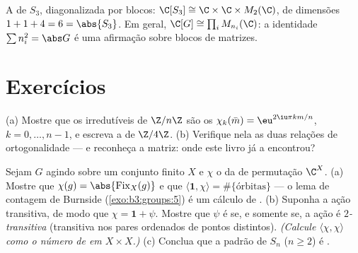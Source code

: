 \begin{omfigure}

{\small A  de $S_3$, diagonalizada por blocos:
$\C[S_3] \cong \C \times \C \times M_2(\C)$, de dimensões $1 + 1 +
4 = 6 = \abs{S_3}$. Em geral, $\C[G] \cong \prod_i
M_{n_i}(\C)$: a identidade $\sum n_i^2 = \abs G$ é uma
afirmação sobre blocos de matrizes.}
\end{omfigure}

\section{Exercícios}

\begin{exercise}[$\star$]\label{exo:b3:representations:1}
(a) Mostre que os  irredutíveis de $\Z/n\Z$ são os $\chi_k(\bar m) = \eu^{2\iu\pi km/n}$,
$k = 0, \dots, n-1$, e escreva a  de $\Z/4\Z$.
(b) Verifique nela as duas relações de ortogonalidade --- e reconheça a
matriz: onde este livro já a encontrou?
\end{exercise}

\begin{exercise}[$\star$]\label{exo:b3:representations:2}
Sejam $G$ agindo sobre um conjunto finito $X$ e $\chi$ o
 da  de permutação $\C^X$.
(a) Mostre que $\chi(g) = \abs{\operatorname{Fix}_X(g)}$ e que $\langle \mathbf 1, \chi\rangle = \#\{\text{órbitas}\}$ --- o lema de contagem de Burnside
(\cref{exo:b3:groups:5}) é um cálculo de .
(b) Suponha a ação transitiva, de modo que $\chi = \mathbf 1 +
\psi$. Mostre que $\psi$
é  se, e somente se, a ação é \emph{$2$-transitiva}
(transitiva nos pares ordenados de pontos distintos). \emph{(Calcule
$\langle\chi,\chi\rangle$ como o número de  em $X \times X$.)}
(c) Conclua que a  padrão de $S_n$ ($n \geq
2$) é
.
\end{exercise}

